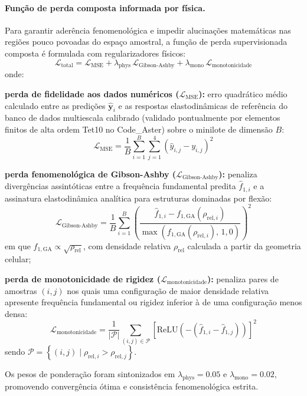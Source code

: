 \paragraph*{Função de perda composta informada por física.}
\label{par:perda}
Para garantir aderência fenomenológica e impedir alucinações matemáticas nas regiões pouco povoadas do espaço amostral, a função de perda supervisionada composta é formulada com regularizadores físicos:
\begin{equation}
  \mathcal{L}_{\text{total}} = \mathcal{L}_{\text{MSE}} + \lambda_{\text{phys}}\,\mathcal{L}_{\text{Gibson-Ashby}} + \lambda_{\text{mono}}\,\mathcal{L}_{\text{monotonicidade}}
  \label{eq:perda-total}
\end{equation}
onde:
\begin{alineas}
  \item \textbf{perda de fidelidade aos dados numéricos ($\mathcal{L}_{\text{MSE}}$):} erro quadrático médio calculado entre as predições $\hat{\mathbf{y}}_i$ e as respostas elastodinâmicas de referência do banco de dados multiescala calibrado (validado pontualmente por elementos finitos de alta ordem Tet10 no Code\_Aster) sobre o minilote de dimensão $B$:
  \begin{equation}
    \mathcal{L}_{\text{MSE}} = \frac{1}{B} \sum_{i=1}^{B} \sum_{j=1}^{4} \left( \hat{y}_{i,j} - y_{i,j} \right)^{2}
    \label{eq:mse}
  \end{equation}
  \item \textbf{perda fenomenológica de Gibson-Ashby ($\mathcal{L}_{\text{Gibson-Ashby}}$):} penaliza divergências assintóticas entre a frequência fundamental predita $\hat{f}_{1,i}$ e a assinatura elastodinâmica analítica para estruturas dominadas por flexão:
  \begin{equation}
    \mathcal{L}_{\text{Gibson-Ashby}} = \frac{1}{B} \sum_{i=1}^{B} \left( \frac{\hat{f}_{1,i} - f_{1,\text{GA}}(\rho_{\text{rel},i})}{\max\!\left( f_{1,\text{GA}}(\rho_{\text{rel},i}),\, 1{,}0 \right)} \right)^{2}
    \label{eq:ga}
  \end{equation}
  em que $f_{1,\text{GA}} \propto \sqrt{\rho_{\text{rel}}}$, com densidade relativa $\rho_{\text{rel}}$ calculada a partir da geometria celular;
  \item \textbf{perda de monotonicidade de rigidez ($\mathcal{L}_{\text{monotonicidade}}$):} penaliza pares de amostras $(i,j)$ nos quais uma configuração de maior densidade relativa apresente frequência fundamental ou rigidez inferior à de uma configuração menos densa:
  \begin{equation}
    \mathcal{L}_{\text{monotonicidade}} = \frac{1}{|\mathcal{P}|} \sum_{(i,j) \in \mathcal{P}} \left[ \mathrm{ReLU}\!\left( -\left( \hat{f}_{1,i} - \hat{f}_{1,j} \right) \right) \right]^{2}
    \label{eq:mono}
  \end{equation}
  sendo $\mathcal{P} = \left\{ (i,j) \mid \rho_{\text{rel},i} > \rho_{\text{rel},j} \right\}$.
\end{alineas}
Os pesos de ponderação foram sintonizados em $\lambda_{\text{phys}} = \num{0.05}$ e $\lambda_{\text{mono}} = \num{0.02}$, promovendo convergência ótima e consistência fenomenológica estrita.

